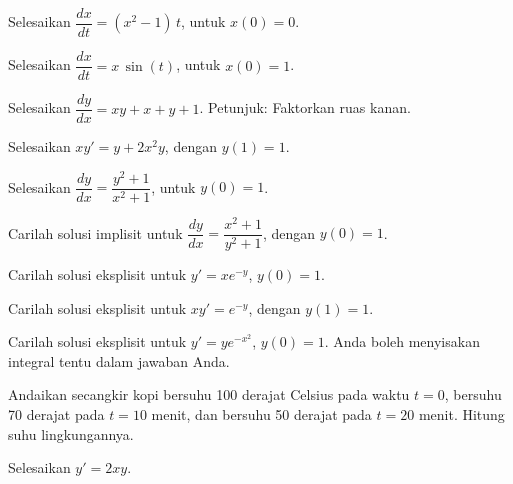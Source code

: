 \begin{exercise}
Selesaikan $\dfrac{dx}{dt} = (x^2-1)\,t$, untuk $x(0) = 0$.
\end{exercise}

\begin{exercise}
Selesaikan $\dfrac{dx}{dt} = x\,\sin(t)$, untuk $x(0) = 1$.
\end{exercise}

\begin{exercise}
Selesaikan $\dfrac{dy}{dx} = xy+x+y+1$. Petunjuk: Faktorkan ruas kanan.
\end{exercise}

\begin{exercise}
Selesaikan $xy' = y + 2x^2 y$, dengan $y(1) = 1$.
\end{exercise}

\begin{exercise}
Selesaikan $\dfrac{dy}{dx} = \dfrac{y^2+1}{x^2+1}$, untuk $y(0) = 1$.
\end{exercise}

\begin{exercise}
Carilah solusi implisit untuk
$\dfrac{dy}{dx} = \dfrac{x^2+1}{y^2+1}$, dengan $y(0) = 1$.
\end{exercise}

\begin{exercise}
Carilah solusi eksplisit untuk $y' = xe^{-y}$, $y(0)=1$.
\end{exercise}

\begin{exercise}
Carilah solusi eksplisit untuk $xy' = e^{-y}$, dengan $y(1)=1$.
\end{exercise}

\begin{exercise}
Carilah solusi eksplisit untuk $y' = ye^{-x^2}$, $y(0)=1$. Anda boleh
menyisakan integral tentu dalam jawaban Anda.
\end{exercise}

\begin{exercise}
Andaikan secangkir kopi bersuhu 100 derajat Celsius pada waktu $t=0$,
bersuhu 70 derajat pada $t=10$ menit, dan bersuhu 50 derajat pada $t=20$
menit. Hitung suhu lingkungannya.
\end{exercise}

\setcounter{exercise}{100}

\begin{exercise}
Selesaikan $y'=2xy$.
\end{exercise}


